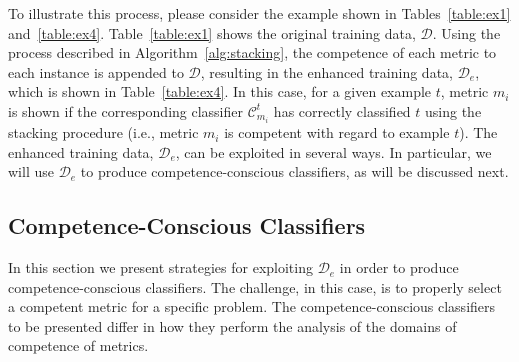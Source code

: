 To illustrate this process, please consider the example shown in Tables~\ref{table:ex1} and~\ref{table:ex4}. Table~\ref{table:ex1} shows the original training data, $\mathcal{D}$. Using the process described in Algorithm~\ref{alg:stacking}, the competence of each metric to each instance is appended to $\mathcal{D}$, resulting in the enhanced training data, $\mathcal{D}_e$, which is shown in Table~\ref{table:ex4}. In this case, for a given example $t$, metric $m_i$ is shown if the corresponding classifier $\mathcal{C}^t_{m_i}$ has correctly classified $t$ using the stacking procedure (i.e., metric $m_i$ is competent with regard to example $t$).
The enhanced training data, $\mathcal{D}_e$, can be exploited in several ways. In particular, we will use $\mathcal{D}_e$ to produce competence-conscious classifiers, as will be discussed next. 


\subsection{Competence-Conscious Classifiers}

In this section we present strategies for exploiting $\mathcal{D}_e$ in order to produce competence-conscious classifiers.
The challenge, in this case, is to properly select a competent metric for a specific problem.
The competence-conscious classifiers to be presented differ in how they perform the analysis of the domains of competence of metrics.

